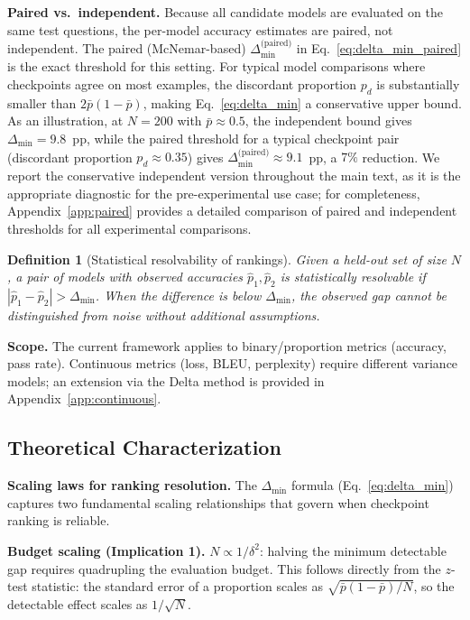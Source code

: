 \documentclass[pdflatex,sn-mathphys-ay,iicol]{sn-jnl}
\theoremstyle{thmstylethree}
\newtheorem{definition}{Definition}
\begin{document}
\noindent\textbf{Paired vs.\ independent.} Because all candidate models are evaluated on the same test questions, the per-model accuracy estimates are paired, not independent. The paired (McNemar-based) $\Delta_{\min}^{\text{(paired)}}$ in Eq.~\eqref{eq:delta_min_paired} is the exact threshold for this setting. For typical model comparisons where checkpoints agree on most examples, the discordant proportion $p_d$ is substantially smaller than $2\bar{p}(1-\bar{p})$, making Eq.~\eqref{eq:delta_min} a conservative upper bound. As an illustration, at $N=200$ with $\bar{p}\approx0.5$, the independent bound gives $\Delta_{\min}=9.8$~pp, while the paired threshold for a typical checkpoint pair (discordant proportion $p_d\approx0.35$) gives $\Delta_{\min}^{\text{(paired)}}\approx9.1$~pp, a $7\%$ reduction. We report the conservative independent version throughout the main text, as it is the appropriate diagnostic for the pre-experimental use case; for completeness, Appendix~\ref{app:paired} provides a detailed comparison of paired and independent thresholds for all experimental comparisons.

\begin{definition}[Statistical resolvability of rankings]\label{def:resolvability}
Given a held-out set of size $N$, a pair of models with observed accuracies $\hat p_1,\hat p_2$ is statistically resolvable if $|\hat p_1-\hat p_2| > \Delta_{\min}$. When the difference is below $\Delta_{\min}$, the observed gap cannot be distinguished from noise without additional assumptions.
\end{definition}

\noindent\textbf{Scope.} The current framework applies to binary/proportion metrics (accuracy, pass rate). Continuous metrics (loss, BLEU, perplexity) require different variance models; an extension via the Delta method is provided in Appendix~\ref{app:continuous}.

\subsection{Theoretical Characterization}

\textbf{Scaling laws for ranking resolution.} The $\Delta_{\min}$ formula (Eq.~\ref{eq:delta_min}) captures two fundamental scaling relationships that govern when checkpoint ranking is reliable.

\noindent\textbf{Budget scaling (Implication 1).} $N \propto 1/\delta^2$: halving the minimum detectable gap requires quadrupling the evaluation budget. This follows directly from the $z$-test statistic: the standard error of a proportion scales as $\sqrt{\bar{p}(1-\bar{p})/N}$, so the detectable effect scales as $1/\sqrt{N}$.
\end{document}
